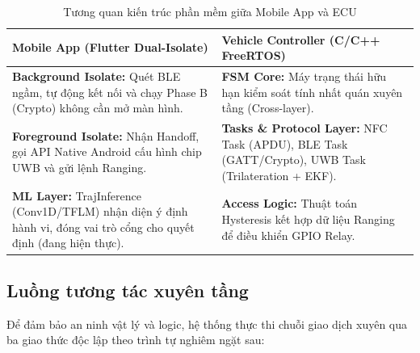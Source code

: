 \begin{table}[H]
\centering
\begin{tabular}{|p{7.2cm}|p{7.2cm}|}
\hline
\textbf{Mobile App (Flutter Dual-Isolate)} & \textbf{Vehicle Controller (C/C++ FreeRTOS)} \\ \hline
\textbf{Background Isolate:} Quét BLE ngầm, tự động kết nối và chạy Phase B (Crypto) không cần mở màn hình. & \textbf{FSM Core:} Máy trạng thái hữu hạn kiểm soát tính nhất quán xuyên tầng (Cross-layer). \\ \hline
\textbf{Foreground Isolate:} Nhận Handoff, gọi API Native Android cấu hình chip UWB và gửi lệnh Ranging. & \textbf{Tasks \& Protocol Layer:} NFC Task (APDU), BLE Task (GATT/Crypto), UWB Task (Trilateration + EKF). \\ \hline
\textbf{ML Layer:} TrajInference (Conv1D/TFLM) nhận diện ý định hành vi, đóng vai trò cổng cho quyết định (đang hiện thực). & \textbf{Access Logic:} Thuật toán Hysteresis kết hợp dữ liệu Ranging để điều khiển GPIO Relay. \\ \hline
\end{tabular}
\caption{Tương quan kiến trúc phần mềm giữa Mobile App và ECU}
\label{tab:sw_arch_new}
\end{table}

\subsection{Luồng tương tác xuyên tầng}

Để đảm bảo an ninh vật lý và logic, hệ thống thực thi chuỗi giao dịch xuyên qua ba giao thức độc lập theo trình tự nghiêm ngặt sau:

